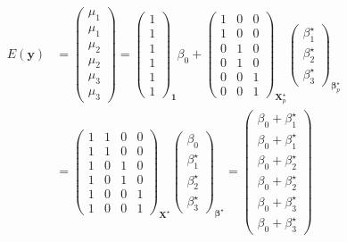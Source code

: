 \begin{align*}
 E(\bm{y}) &= \left(\begin{array}{c} \mu_{1}\\ \mu_{1}\\\hline \mu_{2}\\ \mu_{2}\\\hline \mu_{3}\\ \mu_{3} \end{array}\right)
 = \left(\begin{array}{c} 1\\ 1\\\hline 1\\ 1\\\hline 1\\ 1\end{array}\right)_{\bm{1}} \beta_{0} +
 \left(\begin{array}{ccc}
 1 & 0 & 0\\
 1 & 0 & 0\\\hline
 0 & 1 & 0\\
 0 & 1 & 0\\\hline
 0 & 0 & 1\\
 0 & 0 & 1
 \end{array}\right)_{\bm{X}_{p}^{\star}}
 \left(\begin{array}{c} \beta_{1}^{\star}\\ \beta_{2}^{\star}\\ \beta_{3}^{\star}\end{array}\right)_{\bm{\beta}_{p}^{\star}} \\ &= \left(\begin{array}{cccc}
 1 & 1 & 0 & 0\\
 1 & 1 & 0 & 0\\\hline
 1 & 0 & 1 & 0\\
 1 & 0 & 1 & 0\\\hline
 1 & 0 & 0 & 1\\
 1 & 0 & 0 & 1
 \end{array}\right)_{\bm{X}^{\star}}
 \left(\begin{array}{l} \beta_{0}\\ \beta_{1}^{\star}\\ \beta_{2}^{\star}\\ \beta_{3}^{\star}\end{array}\right)_{\bm{\beta}^{\star}} =
 \left(\begin{array}{c}
 \beta_{0} + \beta_{1}^{\star}\\
 \beta_{0} + \beta_{1}^{\star}\\\hline
 \beta_{0} + \beta_{2}^{\star}\\
 \beta_{0} + \beta_{2}^{\star}\\\hline
 \beta_{0} + \beta_{3}^{\star}\\
 \beta_{0} + \beta_{3}^{\star}
 \end{array}\right)
\end{align*}

